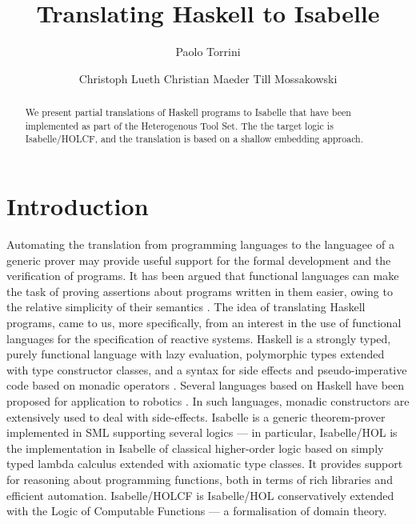 \documentclass{llncs}
\begin{document}
\title{Translating Haskell to Isabelle}
\author{ Paolo Torrini \and
  Christoph Lueth
  Christian Maeder
  Till Mossakowski
}

\maketitle

\begin{abstract}
  We present partial translations of Haskell programs to Isabelle that have
  been implemented as part of the Heterogenous Tool Set. The the target logic
  is Isabelle/HOLCF, and the translation is based on a shallow embedding
  approach.
\end{abstract}

\sloppy

\section{Introduction}
\label{intro}

Automating the translation from programming languages to the languagee of a
generic prover may provide useful support for the formal development and the
verification of programs. It has been argued that functional languages can
make the task of proving assertions about programs written in them easier,
owing to the relative simplicity of their semantics
\cite{Thompson92,Thompson95}. The idea of translating Haskell programs, came
to us, more specifically, from an interest in the use of functional languages
for the specification of reactive systems. Haskell is a strongly typed, purely
functional language with lazy evaluation, polymorphic types extended with type
constructor classes, and a syntax for side effects and pseudo-imperative code
based on monadic operators \cite{HaskellRep}.  Several languages based on
Haskell have been proposed for application to robotics \cite{phh99,Hudak2003}.
In such languages, monadic constructors are extensively used to deal with
side-effects. Isabelle is a generic theorem-prover implemented in SML
supporting several logics --- in particular,  
Isabelle/HOL is the implementation in Isabelle of classical higher-order logic
based on simply typed lambda calculus extended with axiomatic type classes. It
provides support for reasoning about programming functions, both in terms of
rich libraries and efficient automation. 
Isabelle/HOLCF \cite{holcf} \cite{Paulson94isa,holcf} is Isabelle/HOL
conservatively extended with the Logic of Computable Functions --- a
formalisation of domain theory.
\end{document}
